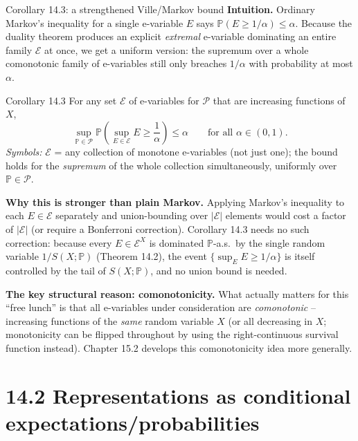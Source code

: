 \documentclass[aspectratio=169,10pt]{beamer}
\newcommand{\PP}{\mathbb{P}}
\newcommand{\calE}{\mathcal{E}}
\newcommand{\calP}{\mathcal{P}}
\begin{document}
\begin{frame}[allowframebreaks]{Corollary 14.3: a strengthened Ville/Markov bound}
  \textbf{Intuition.} Ordinary Markov's inequality for a single e-variable
  $E$ says $\PP(E \geq 1/\alpha) \leq \alpha$. Because the duality theorem
  produces an explicit \emph{extremal} e-variable dominating an entire
  family $\calE$ at once, we get a uniform version: the supremum over a
  whole comonotonic family of e-variables still only breaches $1/\alpha$
  with probability at most $\alpha$.

  \begin{block}{Corollary 14.3}
    For any set $\calE$ of e-variables for $\calP$ that are increasing
    functions of $X$,
    \[
      \sup_{\PP\in\calP} \PP\left(\sup_{E\in\calE} E \geq \frac{1}{\alpha}\right) \leq \alpha
      \qquad \text{for all } \alpha \in (0,1).
    \]
    \emph{Symbols:} $\calE$ = any collection of monotone e-variables (not
    just one); the bound holds for the \emph{supremum} of the whole
    collection simultaneously, uniformly over $\PP \in \calP$.
  \end{block}

  \framebreak

  \textbf{Why this is stronger than plain Markov.} Applying Markov's
  inequality to each $E \in \calE$ separately and union-bounding over
  $|\calE|$ elements would cost a factor of $|\calE|$ (or require a
  Bonferroni correction). Corollary 14.3 needs no such correction: because
  every $E \in \calE^X$ is dominated $\PP$-a.s.\ by the single random
  variable $1/S(X;\PP)$ (Theorem 14.2), the event
  $\{\sup_{E} E \geq 1/\alpha\}$ is itself controlled by the tail of
  $S(X;\PP)$, and no union bound is needed.

  \textbf{The key structural reason: comonotonicity.} What actually
  matters for this ``free lunch'' is that all e-variables under
  consideration are \emph{comonotonic} -- increasing functions of the
  \emph{same} random variable $X$ (or all decreasing in $X$; monotonicity
  can be flipped throughout by using the right-continuous survival
  function instead). Chapter 15.2 develops this comonotonicity idea more
  generally.
\end{frame}

\section{14.2 Representations as conditional expectations/probabilities}
\end{document}
